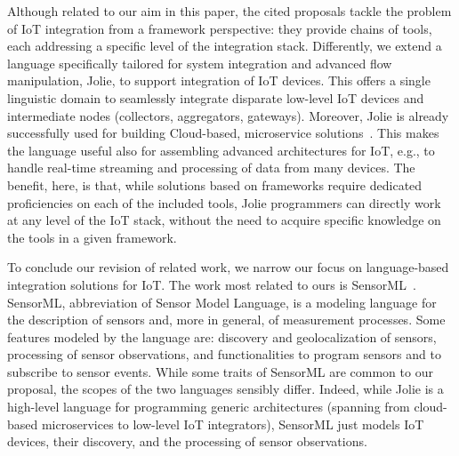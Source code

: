 Although related to our aim in this paper, the cited proposals tackle the
problem of IoT integration from a framework perspective: they provide chains of
tools, each addressing a specific level of the integration stack. Differently,
we extend a language specifically tailored for system integration and advanced
flow manipulation, Jolie, to support integration of IoT devices. This offers a
single linguistic domain to seamlessly integrate disparate low-level IoT devices
and intermediate nodes (collectors, aggregators, gateways). Moreover, Jolie is
already successfully used for building Cloud-based, microservice
solutions~\cite{GabbrielliGGMM16,MelisPGC17}. This makes the language useful
also for assembling advanced architectures for IoT, e.g., to handle real-time
streaming and processing of data from many devices. The benefit, here, is that,
while solutions based on frameworks require dedicated proficiencies on each of
the included tools, Jolie programmers can directly work at any level of the IoT
stack, without the need to acquire specific knowledge on the tools in a given
framework.

To conclude our revision of related work, we narrow our focus on language-based
integration solutions for IoT. The work most related to ours is
SensorML~\cite{SensorML}.
%
SensorML, abbreviation of Sensor Model Language, is a modeling
language for the description of sensors and, more in general, of measurement
processes. Some features modeled by the language are: discovery and
geolocalization of sensors, processing of sensor observations, and
functionalities to program sensors and to subscribe to sensor events.
%
While some traits of SensorML are common to our proposal, the scopes of the two
languages sensibly differ. Indeed, while Jolie is a high-level language for
programming generic architectures (spanning from cloud-based microservices to
low-level IoT integrators), SensorML just models IoT devices, their discovery,
and the processing of sensor observations.

%
